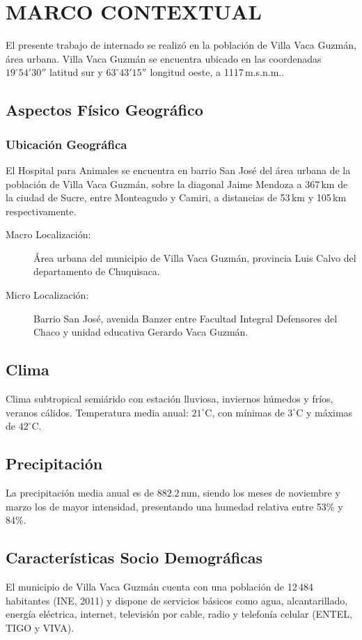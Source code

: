 \clearpage

\section{MARCO CONTEXTUAL}

El presente trabajo de internado se realizó en la población de Villa Vaca Guzmán, área urbana.
Villa Vaca Guzmán se encuentra ubicado en las coordenadas \(19^{\circ}54'30''\) latitud sur y \(63^{\circ}43'15''\) longitud oeste, a 1117\,m.s.n.m..

\subsection{Aspectos Físico Geográfico}
    \subsubsection{Ubicación Geográfica}
        El Hospital para Animales se encuentra en barrio San José del área urbana de la población de Villa Vaca Guzmán, sobre la diagonal Jaime Mendoza a 367\,km de la ciudad de Sucre, entre Monteagudo y Camiri, a distancias de 53\,km y 105\,km respectivamente.

        \begin{description}
            \item[Macro Localización:] Área urbana del municipio de Villa Vaca Guzmán, provincia Luis Calvo del departamento de Chuquisaca.
            \item[Micro Localización:] Barrio San José, avenida Banzer entre Facultad Integral Defensores del Chaco y unidad educativa Gerardo Vaca Guzmán.
        \end{description}

\subsection{Clima}
	Clima subtropical semiárido con estación lluviosa, inviernos húmedos y fríos, veranos cálidos. Temperatura media anual: \(21^{\circ}\text{C}\), con mínimas de \(3^{\circ}\text{C}\) y máximas de \(42^{\circ}\text{C}\).

\subsection{Precipitación}
    La precipitación media anual es de \(882.2\,\text{mm}\), siendo los meses de noviembre y marzo los de mayor intensidad, presentando una humedad relativa entre 53\!\% y 84\!\%.

\subsection{Características Socio Demográficas}
    El municipio de Villa Vaca Guzmán cuenta con una población de 12\,484 habitantes (INE, 2011) y dispone de servicios básicos como agua, alcantarillado, energía eléctrica, internet, televisión por cable, radio y telefonía celular (ENTEL, TIGO y VIVA).
